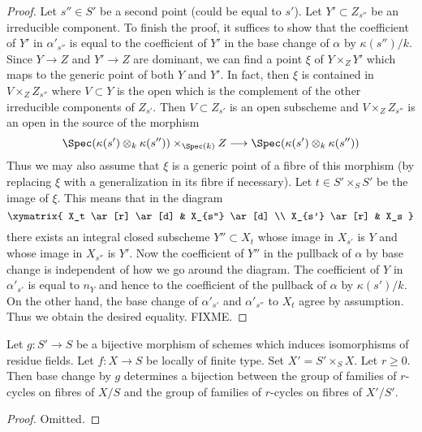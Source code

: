 \begin{proof}
\medskip\noindent
Let $s'' \in S'$ be a second point (could be equal to $s'$).
Let $Y' \subset Z_{s''}$ be an irreducible component.
To finish the proof, it suffices to show that the coefficient
of $Y'$ in $\alpha'_{s''}$ is equal to the coefficient of $Y'$
in the base change of $\alpha$ by $\kappa(s'')/k$.
Since $Y \to Z$ and $Y' \to Z$ are dominant, we can find a point
$\xi$ of $Y \times_Z Y'$ which maps to the generic point of both
$Y$ and $Y'$. In fact, then $\xi$ is contained in $V \times_Z Z_{s''}$
where $V \subset Y$ is the open which is the complement of the
other irreducible components of $Z_{s'}$.
Then $V \subset Z_{s'}$ is an open subscheme and
$V \times_Z Z_{s''}$ is an open in the source of the morphism
$$
\Spec(\kappa(s') \otimes_k \kappa(s''))
\times_{\Spec(k)} Z
\longrightarrow
\Spec(\kappa(s') \otimes_k \kappa(s''))
$$
Thus we may also assume that $\xi$ is a generic point
of a fibre of this morphism (by replacing $\xi$ with a generalization
in its fibre if necessary). Let $t \in S' \times_S S'$ be the
image of $\xi$. This means that in the diagram
$$
\xymatrix{
X_t \ar[r] \ar[d] & X_{s''} \ar[d] \\
X_{s'} \ar[r] & X_s
}
$$
there exists an integral closed subscheme $Y'' \subset X_t$
whose image in $X_{s'}$ is $Y$ and whose image in $X_{s''}$
is $Y'$. Now the coefficient of $Y''$ in the pullback of
$\alpha$ by base change is independent of how we go
around the diagram. The coefficient of $Y$ in $\alpha'_{s'}$
is equal to $n_Y$ and hence to the coefficient of the pullback
of $\alpha$ by $\kappa(s')/k$. On the other hand, the base
change of $\alpha'_{s'}$ and $\alpha'_{s''}$ to $X_t$ agree
by assumption. Thus we obtain the desired equality.
FIXME.
\end{proof}

\begin{lemma}
\label{lemma-pullback-universally-bijective}
Let $g : S' \to S$ be a bijective morphism of schemes
which induces isomorphisms of residue fields.
Let $f : X \to S$ be locally of finite type. Set $X' = S' \times_S X$.
Let $r \geq 0$. Then base change by $g$ determines a bijection
between the group of families of $r$-cycles on fibres of $X/S$ and
the group of families of $r$-cycles on fibres of $X'/S'$.
\end{lemma}

\begin{proof}
Omitted.
\end{proof}

